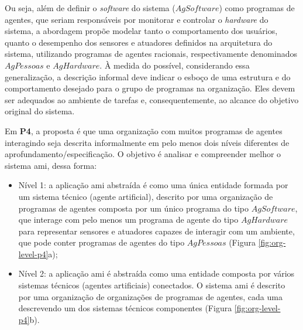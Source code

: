     \clearpage
    \begin{figure}[h!]
        \centering
    \end{figure}
    
    Ou seja, além de definir o \textit{software} do sistema ($AgSoftware$) como programas de agentes, que seriam responsáveis por monitorar e controlar o \textit{hardware} do sistema, a abordagem propõe modelar tanto o comportamento dos usuários, quanto o desempenho dos sensores e atuadores definidos na arquitetura do sistema, utilizando programas de agentes racionais, respectivamente denominados $AgPessoas$ e $AgHardware$. À medida do possível, considerando essa generalização, a descrição informal deve indicar o esboço de uma estrutura e do comportamento desejado para o grupo de programas na organização. Eles devem ser adequados ao ambiente de tarefas e, consequentemente, ao alcance do objetivo original do sistema.
    
    Em \textbf{P4}, a proposta é que uma organização com muitos programas de agentes interagindo seja descrita informalmente em pelo menos dois níveis diferentes de aprofundamento/especificação. O objetivo é analisar e compreender melhor o sistema \acrshort{ami}, dessa forma: 
    
    \begin{itemize}
        
        \item Nível 1: a aplicação \acrshort{ami} abstraída é como uma única entidade formada por um sistema técnico (agente artificial), descrito por uma organização de programas de agentes composta por um único programa do tipo $AgSoftware$, que interage com pelo menos um programa de agente do tipo $AgHardware$ para representar sensores e atuadores capazes de interagir com um ambiente, que pode conter programas de agentes do tipo $AgPessoas$ (Figura \ref{fig:org-level-p4}a); 
        
        \item Nível 2:  a aplicação \acrshort{ami} é abstraída como uma entidade composta por vários sistemas técnicos (agentes artificiais) conectados. O sistema \acrshort{ami} é descrito por uma organização de organizações de programas de agentes, cada uma descrevendo um dos sistemas técnicos componentes (Figura \ref{fig:org-level-p4}b). 
    
    \clearpage
    \end{itemize}
    
